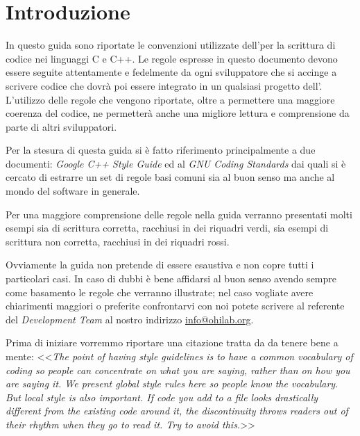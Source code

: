 %

\section{Introduzione}\label{sec:overview}

In questo guida sono riportate le convenzioni utilizzate dell'\associazione per la scrittura di codice nei linguaggi C e C++.
Le regole espresse in questo documento devono essere seguite attentamente e fedelmente da ogni sviluppatore che si accinge a scrivere codice che dovrà poi essere integrato in un qualsiasi progetto dell'\sigla.
L'utilizzo delle regole che vengono riportate, oltre a permettere una maggiore coerenza del codice, ne permetterà anche una migliore lettura e comprensione da parte di altri sviluppatori.

Per la stesura di questa guida si è fatto riferimento principalmente a due documenti: \emph{Google C++ Style Guide}\cite{codestyle:google} ed al \emph{GNU Coding Standards}\cite{codestyle:gnu} dai quali si è cercato di estrarre un set di regole basi comuni sia al buon senso ma anche al mondo del software in generale.

Per una maggiore comprensione delle regole nella guida verranno presentati molti esempi sia di scrittura corretta, racchiusi in dei riquadri verdi, sia esempi di scrittura non corretta, racchiusi in dei riquadri rossi.

Ovviamente la guida non pretende di essere esaustiva e non copre tutti i particolari casi.
In caso di dubbi è bene affidarsi al buon senso avendo sempre come basamento le regole che verranno illustrate; nel caso vogliate avere chiarimenti maggiori o preferite confrontarvi con noi potete scrivere al referente del \emph{Development Team} al nostro indirizzo \url{info@ohilab.org}.

Prima di iniziare vorremmo riportare una citazione tratta da \cite{codestyle:google} da tenere bene a mente: <<\emph{The point of having style guidelines is to have a common vocabulary of coding so people can concentrate on what you are saying, rather than on how you are saying it. We present global style rules here so people know the vocabulary. But local style is also important. If code you add to a file looks drastically different from the existing code around it, the discontinuity throws readers out of their rhythm when they go to read it. Try to avoid this.}>>